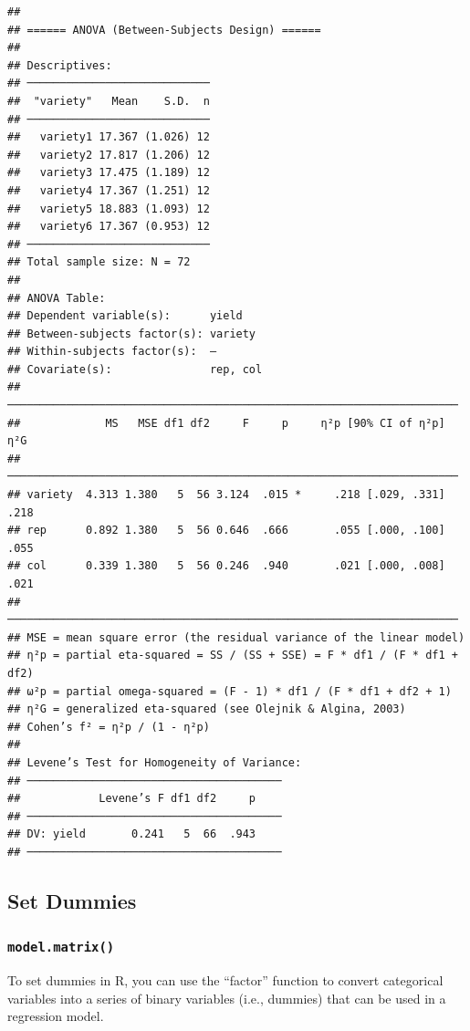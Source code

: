 \documentclass[
]{ctexart}
\begin{document}
\begin{verbatim}
## 
## ====== ANOVA (Between-Subjects Design) ======
## 
## Descriptives:
## ────────────────────────────
##  "variety"   Mean    S.D.  n
## ────────────────────────────
##   variety1 17.367 (1.026) 12
##   variety2 17.817 (1.206) 12
##   variety3 17.475 (1.189) 12
##   variety4 17.367 (1.251) 12
##   variety5 18.883 (1.093) 12
##   variety6 17.367 (0.953) 12
## ────────────────────────────
## Total sample size: N = 72
## 
## ANOVA Table:
## Dependent variable(s):      yield
## Between-subjects factor(s): variety
## Within-subjects factor(s):  –
## Covariate(s):               rep, col
## ─────────────────────────────────────────────────────────────────────
##             MS   MSE df1 df2     F     p     η²p [90% CI of η²p]  η²G
## ─────────────────────────────────────────────────────────────────────
## variety  4.313 1.380   5  56 3.124  .015 *     .218 [.029, .331] .218
## rep      0.892 1.380   5  56 0.646  .666       .055 [.000, .100] .055
## col      0.339 1.380   5  56 0.246  .940       .021 [.000, .008] .021
## ─────────────────────────────────────────────────────────────────────
## MSE = mean square error (the residual variance of the linear model)
## η²p = partial eta-squared = SS / (SS + SSE) = F * df1 / (F * df1 + df2)
## ω²p = partial omega-squared = (F - 1) * df1 / (F * df1 + df2 + 1)
## η²G = generalized eta-squared (see Olejnik & Algina, 2003)
## Cohen’s f² = η²p / (1 - η²p)
## 
## Levene’s Test for Homogeneity of Variance:
## ───────────────────────────────────────
##            Levene’s F df1 df2     p    
## ───────────────────────────────────────
## DV: yield       0.241   5  66  .943    
## ───────────────────────────────────────
\end{verbatim}

\hypertarget{set-dummies}{%
\subsection{Set Dummies}\label{set-dummies}}

\hypertarget{model.matrix}{%
\subsubsection{\texorpdfstring{\texttt{model.matrix()}}{model.matrix()}}\label{model.matrix}}

To set dummies in R, you can use the ``factor'' function to convert
categorical variables into a series of binary variables (i.e., dummies)
that can be used in a regression model.
\end{document}
